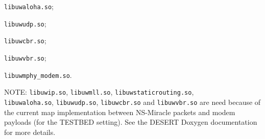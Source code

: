 \begin{description}
\begin{description}
      \item {\tt libuwaloha.so};
      \item {\tt libuwudp.so};
      \item {\tt libuwcbr.so};
      \item {\tt libuwvbr.so};
      \item {\tt libuwmphy\_modem.so}.
	   \end{description} 
      NOTE: {\tt libuwip.so}, {\tt libuwmll.so}, {\tt libuwstaticrouting.so}, \\ {\tt libuwaloha.so}, {\tt libuwudp.so}, {\tt libuwcbr.so} and {\tt libuwvbr.so} are need because of the current map implementation between NS-Miracle packets and modem payloads (for the TESTBED setting). See the DESERT Doxygen documentation for more details.

\end{description}

\vspace{1 cm}

